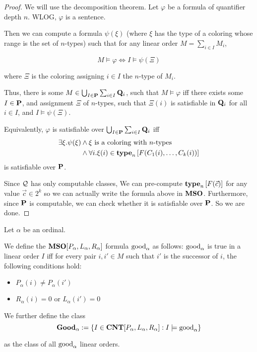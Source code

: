 \begin{proof}
  We will use the decomposition theorem.
  Let $\varphi$ be a formula of quantifier depth $n$. WLOG, $\varphi$ is a sentence.

  Then we can compute a formula $\psi(\xi)$ (where
  $\xi$ has the type of a coloring whose range is
  the set of $n$-types) such that
  for any linear order $M = \sum_{i \in I} M_i$,

  \[
    M \models \varphi \iff I \models \psi(\Xi)
  \]

  where $\Xi$ is the coloring assigning $i \in I$ the $n$-type of $M_i$.

  Thus, there is some $M \in \bigcup_{I \in \mathbf{P}} \sum_{i \in I} \mathbf{Q}_i$,
  such that $M \models \varphi$
  iff there exists some $I \in \mathbf{P}$, and assignment $\Xi$ of $n$-types,
  such that $\Xi(i)$ is satisfiable in $\mathbf{Q}_i$ for all $i \in I$, and $I \models \psi(\Xi)$.

  Equivalently, $\varphi$ is satisfiable over $\bigcup_{I \in \mathbf{P}} \sum_{i \in I} \mathbf{Q}_i$
  iff
  \begin{align*}
    \exists \xi. \psi(\xi)
     & \wedge \xi \text{ is a coloring with }n\text{-types}             \\
     & \wedge \forall i. \xi(i) \in \mathbf{type}_{n} \left[ {F(C_1(i), \ldots, C_k(i))} \right]
  \end{align*}
  is satisfiable over $\mathbf{P}$.

  Since $\mathcal{Q}$ has only computable classes, We can pre-compute $\mathbf{type}_{n} \left[ {F(\vec{c})} \right]$
  for any value $\vec{c} \in 2^k$ so we can actually write the formula above in
  $\mathbf{MSO}$. Furthermore, since $\mathbf{P}$ is computable, we can check whether it is satisfiable
  over $\mathbf{P}$. So we are done.
\end{proof}

\begin{definition}
  Let $\alpha$ be an ordinal.

  We define the $\mathbf{MSO}[P_\alpha, L_\alpha, R_\alpha]$ formula $\mathrm{good}_{\alpha}$ as follows:
  $\mathrm{good}_{\alpha}$ is true in a linear order $I$ iff
  for every pair $i, i' \in M$ such that $i'$ is the successor of $i$, the following conditions hold:
  \begin{itemize}
    \item $P_\alpha(i) \ne P_\alpha(i')$
    \item $R_\alpha(i) = 0$ or $L_\alpha(i') = 0$
  \end{itemize}

  We further define the class
  \[
    \mathbf{Good}_{\alpha} := \left\{ {I \in \mathbf{CNT} [P_\alpha, L_\alpha, R_\alpha] : I \models \mathrm{good}_{\alpha}} \right\}
  \]

  as the class of all $\mathrm{good}_{\alpha}$ linear orders.
\end{definition}

